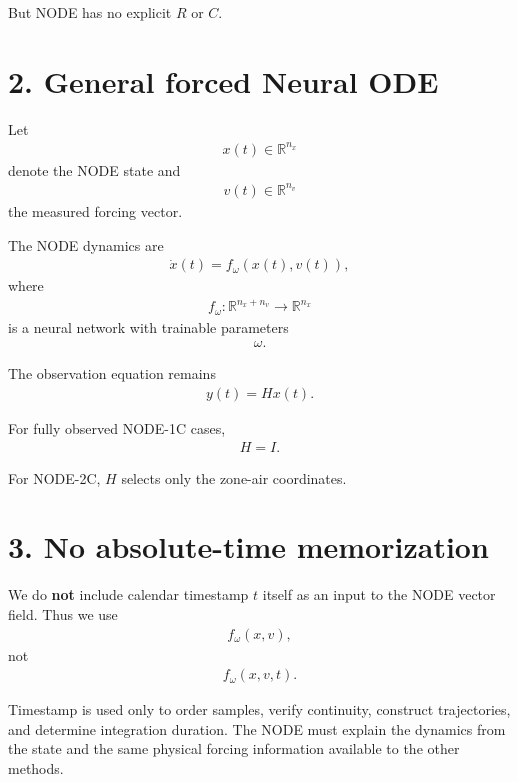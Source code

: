 \documentclass[11pt]{article}
\begin{document}
But NODE has no explicit \(R\) or \(C\).

\section*{2. General forced Neural ODE}

Let
\begin{align}
x(t)\in\mathbb R^{n_x}
\end{align}
denote the NODE state and
\begin{align}
v(t)\in\mathbb R^{n_v}
\end{align}
the measured forcing vector.

The NODE dynamics are
\begin{align}
\boxed{
\dot x(t)=f_\omega\left(x(t),v(t)\right),
}
\tag{N3.1}
\end{align}
where
\begin{align}
f_\omega:\mathbb R^{n_x+n_v}\rightarrow\mathbb R^{n_x}
\end{align}
is a neural network with trainable parameters
\begin{align}
\omega.
\end{align}

The observation equation remains
\begin{align}
\boxed{y(t)=Hx(t).}
\tag{N3.2}
\end{align}

For fully observed NODE-1C cases,
\begin{align}
H=I.
\end{align}

For NODE-2C, \(H\) selects only the zone-air coordinates.

\section*{3. No absolute-time memorization}

We do \textbf{not} include calendar timestamp \(t\) itself as an input to the NODE vector field. Thus we use
\begin{align}
f_\omega(x,v),
\end{align}
not
\begin{align}
f_\omega(x,v,t).
\end{align}

Timestamp is used only to order samples, verify continuity, construct trajectories, and determine integration duration. The NODE must explain the dynamics from the state and the same physical forcing information available to the other methods.
\end{document}
